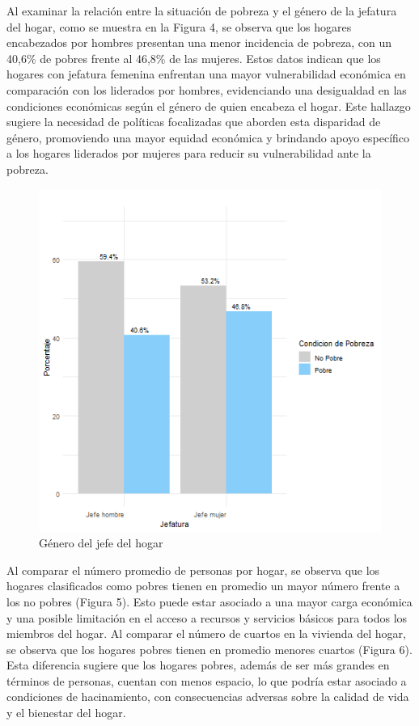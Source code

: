 \documentclass[a4paper]{article}
\theoremstyle{remark}
\theoremstyle{definition}
\begin{document}
Al examinar la relación entre la situación de pobreza y el género de la jefatura del hogar, como se muestra en la Figura 4, se observa que los hogares encabezados por hombres presentan una menor incidencia de pobreza, con un 40,6\% de pobres frente al 46,8\% de las mujeres. Estos datos indican que los hogares con jefatura femenina enfrentan una mayor vulnerabilidad económica en comparación con los liderados por hombres, evidenciando una desigualdad en las condiciones económicas según el género de quien encabeza el hogar. Este hallazgo sugiere la necesidad de políticas focalizadas que aborden esta disparidad de género, promoviendo una mayor equidad económica y brindando apoyo específico a los hogares liderados por mujeres para reducir su vulnerabilidad ante la pobreza. \\


    \begin{figure}[H]
        \centering
            \caption{Género del jefe del hogar}
        \includegraphics[width=0.5\linewidth]{Graficas/Jefatura.png}
    \end{figure}


Al comparar el número promedio de personas por hogar, se observa que los hogares clasificados como pobres tienen en promedio un mayor número frente a los no pobres (Figura 5). Esto puede estar asociado a una mayor carga económica y una posible limitación en el acceso a recursos y servicios básicos para todos los miembros del hogar. Al comparar el número de cuartos en la vivienda del hogar, se observa que los hogares pobres tienen en promedio menores cuartos (Figura 6). Esta diferencia sugiere que los hogares pobres, además de ser más grandes en términos de personas, cuentan con menos espacio, lo que podría estar asociado a condiciones de hacinamiento, con consecuencias adversas sobre la calidad de vida y el bienestar del hogar.\\
\end{document}
